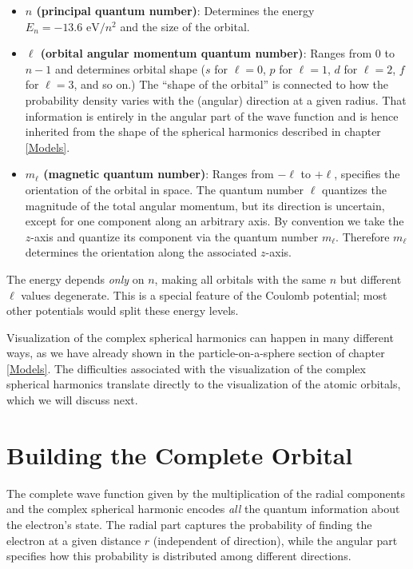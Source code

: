 \documentclass[
  english,
  9pt,
]{extbook}
\providecommand{\tightlist}{%
  \setlength{\itemsep}{0pt}\setlength{\parskip}{0pt}}
\theoremstyle{definition}
\theoremstyle{definition}
\theoremstyle{definition}
\theoremstyle{definition}
\theoremstyle{remark}
\begin{document}
\begin{itemize}
\tightlist
\item
  \textbf{\(n\) (principal quantum number)}: Determines the energy \(E_n = -13.6 \text{ eV}/n^2\) and the size of the orbital.
\item
  \textbf{\(\ell\) (orbital angular momentum quantum number)}: Ranges from \(0\) to \(n-1\) and determines orbital shape (\(s\) for \(\ell=0\), \(p\) for \(\ell=1\), \(d\) for \(\ell=2\), \(f\) for \(\ell=3\), and so on.) The ``shape of the orbital'' is connected to how the probability density varies with the (angular) direction at a given radius. That information is entirely in the angular part of the wave function and is hence inherited from the shape of the spherical harmonics described in chapter \ref{Models}.
\item
  \textbf{\(m_\ell\) (magnetic quantum number)}: Ranges from \(-\ell\) to \(+\ell\), specifies the orientation of the orbital in space. The quantum number \(\ell\) quantizes the magnitude of the total angular momentum, but its direction is uncertain, except for one component along an arbitrary axis. By convention we take the \(z\)-axis and quantize its component via the quantum number \(m_\ell\). Therefore \(m_\ell\) determines the orientation along the associated \(z\)-axis.
\end{itemize}

The energy depends \emph{only} on \(n\), making all orbitals with the same \(n\) but different \(\ell\) values degenerate. This is a special feature of the Coulomb potential; most other potentials would split these energy levels.

Visualization of the complex spherical harmonics can happen in many different ways, as we have already shown in the particle-on-a-sphere section of chapter \ref{Models}. The difficulties associated with the visualization of the complex spherical harmonics translate directly to the visualization of the atomic orbitals, which we will discuss next.

\section{Building the Complete Orbital}\label{building-the-complete-orbital}

The complete wave function given by the multiplication of the radial components and the complex spherical harmonic encodes \emph{all} the quantum information about the electron's state. The radial part captures the probability of finding the electron at a given distance \(r\) (independent of direction), while the angular part specifies how this probability is distributed among different directions.
\end{document}
